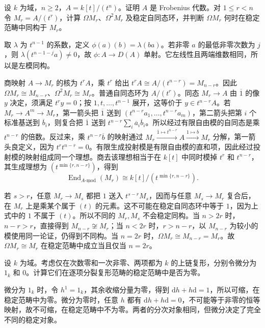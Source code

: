 \begin{exercise}\label{b4:ex:D-truncated-cubic-period}
	设 \(k\) 为域，\(n\ge2\)，\(A=k[t]/(t^n)\)。证明 \(A\) 是 Frobenius 代数。对 \(1\le r<n\) 令 \(M_r=A/(t^r)\)，计算 \(\Omega M_r\)、\(\Omega^2M_r\) 及稳定自同态环，并判断 \(\Omega M_r\) 何时在稳定范畴中同构于 \(M_r\)。
\end{exercise}
\begin{solution}
	取 \(\lambda\) 为 \(t^{n-1}\) 的系数，定义 \(\phi(a)(b)=\lambda(ba)\)。若非零 \(a\) 的最低非零次数为 \(j\)，则 \(\lambda(t^{n-1-j}a)\ne0\)，故 \(\phi:A\to D(A)\) 单射。它左线性且两端维数相同，所以是左模同构。

	商映射 \(A\to M_r\) 的核为 \(t^rA\)，乘 \(t^r\) 给出 \(t^rA\cong A/(t^{n-r})=M_{n-r}\)。因此 \(\Omega M_r\cong M_{n-r}\)、\(\Omega^2M_r\cong M_r\)。普通自同态环为 \(A/(t^r)\)。同态 \(M_r\to A\) 由 \(\overline1\) 的像 \(y\) 决定，须满足 \(t^ry=0\)；按 \(1,t,\ldots,t^{n-1}\) 展开，这等价于 \(y\in t^{n-r}A\)。若 \(M_r\to A^m\to M_r\)，第一箭头把 \(\overline1\) 送到 \((t^{n-r}a_1,\ldots,t^{n-r}a_m)\)，第二箭头把第 \(i\) 个标准基送到 \(\overline b_i\)，则复合把 \(\overline1\) 送到 \(t^{n-r}\sum_i\overline a_i\overline b_i\)。所以经过有限自由模的自同态是乘 \(t^{n-r}\) 的倍数。反过来，乘 \(t^{n-r}\overline b\) 的映射通过 \(M_r\xrightarrow{\overline1\mapsto t^{n-r}}A\xrightarrow{1\mapsto\overline b}M_r\) 分解，第一箭头良定义，因为 \(t^rt^{n-r}=0\)。有限生成投射模是有限自由模的直和项，因此经过投射模的映射组成同一个理想。商去该理想相当于在 \(k[t]\) 中同时模掉 \(t^r\) 和 \(t^{n-r}\)，其生成理想为 \((t^{\min\{r,n-r\}})\)，得到
	\[
		\operatorname{End}_{\underline{A\text{-}\mathrm{mod}}}(M_r) \cong k[t]/(t^{\min\{r,n-r\}}).
	\]

	若 \(s>r\)，任意 \(M_r\to M_s\) 都把 \(1\) 送入 \(t^{s-r}M_s\)，因而与任意 \(M_s\to M_r\) 复合后，在 \(M_r\) 上是乘某个属于 \((t)\) 的元素。这不可能在稳定自同态环中等于 \(1\)，因为上式中的 \(1\) 不属于 \((t)\)。所以不同的 \(M_r,M_s\) 不会稳定同构。当 \(n>2r\) 时，\(n-r>r\)，直接得到 \(M_{n-r}\not\cong M_r\)；当 \(n<2r\) 时，\(r>n-r\)，以 \(M_{n-r}\) 为较小的模使用同一论证，仍得到不同构。当 \(n=2r\) 时，\(\Omega M_r\cong M_{n-r}=M_r\)。故 \(\Omega M_r\cong M_r\) 在稳定范畴中成立当且仅当 \(n=2r\)。
\end{solution}

\begin{exercise}\label{b4:ex:D-same-graded-different-contractibility}
	设 \(k\) 为域。考虑仅在次数零和一次非零、两项都为 \(k\) 的上链复形，分别令微分为 \(1_k\) 和 \(0\)。计算它们在逐项分裂复形范畴的稳定范畴中是否为零。
\end{exercise}
\begin{solution}
	微分为 \(1_k\) 时，令 \(h^1=1_k\)，其余收缩分量为零，得到 \(\mathrm{d}h+h\mathrm{d}=1\)，所以可缩，在稳定范畴中为零。微分为零时，任意 \(h\) 都有 \(\mathrm{d}h+h\mathrm{d}=0\)，不可能等于非零的恒等映射，故不可缩，在稳定范畴中不为零。两者的分次对象相同，但微分决定了完全不同的稳定对象。
\end{solution}

